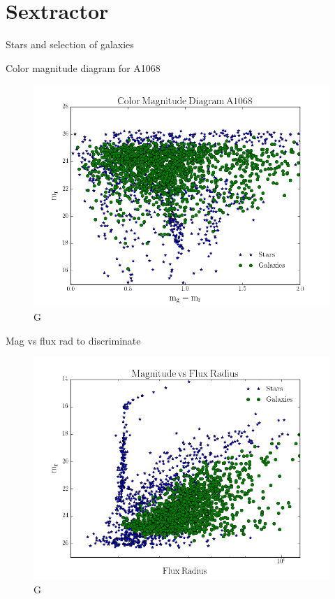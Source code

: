 \section{Sextractor}

Stars and selection of galaxies

Color magnitude diagram for A1068

\begin{figure}[H]
\centering
\includegraphics[width=12cm]{images/color mag.png}
\caption[M]{G}
\end{figure}

Mag vs flux rad to discriminate

\begin{figure}[H]
\centering
\includegraphics[width=12cm]{images/mag vs flux rad.png}
\caption[M]{G}
\end{figure}

